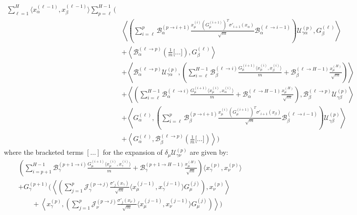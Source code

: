 \documentclass[11pt,a4paper]{article}
\theoremstyle{definition}
\begin{document}
\begin{align}
    \sum_{\ell=1}^{H} \langle x^{(\ell-1)}_\alpha, x^{(\ell-1)}_\beta \rangle \sum_{p=\ell}^{H-1} \Biggl( & \nonumber \\
    & \left\langle \left( \sum_{i=\ell}^{p} \mathcal{B}^{(p \to i+1)}_\alpha \frac{x^{(i)}_\mu (G^{(i+1)}_\mu)^T \sigma'_{i+1}(x_\alpha)}{\sqrt{m}} \mathcal{B}^{(\ell \to i-1)}_\alpha \right) \mathcal{U}^{(p)}_{\gamma\alpha}, G^{(\ell)}_\beta \right\rangle \nonumber \\
    & + \left\langle \mathcal{B}^{(\ell \to p)}_{\alpha} \left( \frac{1}{m} \Big[ \dots \Big] \right), G^{(\ell)}_\beta \right\rangle \nonumber \\
    & + \left\langle \mathcal{B}^{(\ell \to p)}_{\alpha} \mathcal{U}^{(p)}_{\gamma\alpha}, \left( \sum_{i=\ell}^{H-1} \mathcal{B}^{(\ell \to i)}_{\beta} \frac{G^{(i+1)}_\mu \langle x^{(i)}_\mu, x^{(i)}_\beta \rangle}{m} + \mathcal{B}^{(\ell \to H-1)}_{\beta} \frac{x^{(H)}_\mu}{\sqrt{m}} \right) \right\rangle \nonumber \\
    & + \left\langle \left( \sum_{i=\ell}^{H-1} \mathcal{B}^{(\ell \to i)}_{\alpha} \frac{G^{(i+1)}_\mu \langle x^{(i)}_\mu, x^{(i)}_\alpha \rangle}{m} + \mathcal{B}^{(\ell \to H-1)}_{\alpha} \frac{x^{(H)}_\mu}{\sqrt{m}} \right), \mathcal{B}^{(\ell \to p)}_{\beta} \mathcal{U}^{(p)}_{\gamma\beta} \right\rangle \nonumber \\
    & + \left\langle G^{(\ell)}_\alpha, \left( \sum_{i=\ell}^{p} \mathcal{B}^{(p \to i+1)}_\beta \frac{x^{(i)}_\mu (G^{(i+1)}_\mu)^T \sigma'_{i+1}(x_\beta)}{\sqrt{m}} \mathcal{B}^{(\ell \to i-1)}_\beta \right) \mathcal{U}^{(p)}_{\gamma\beta} \right\rangle \nonumber \\
    & + \left\langle G^{(\ell)}_\alpha, \mathcal{B}^{(\ell \to p)}_{\beta} \left( \frac{1}{m} \Big[ \dots \Big] \right) \right\rangle \Biggr)
    \end{align}
    where the bracketed terms $[\dots]$ for the expansion of $\delta_\mu\mathcal{U}^{(p)}_{\gamma\nu}$ are given by:
    \begin{align}
    & \left( \sum_{i=p+1}^{H-1} \mathcal{B}^{(p+1 \to i)}_{\gamma} \frac{G^{(i+1)}_\mu \langle x^{(i)}_\mu, x^{(i)}_\gamma \rangle}{m} + \mathcal{B}^{(p+1 \to H-1)}_{\gamma} \frac{x^{(H)}_\mu}{\sqrt{m}} \right) \langle x^{(p)}_\gamma, x^{(p)}_\nu \rangle \nonumber \\
    & + G^{(p+1)}_\gamma \Biggl( \left\langle \left( \sum_{j=1}^{p} \mathcal{J}^{(p \to j)}_{\gamma} \frac{\sigma'_{j}(x_\gamma)}{\sqrt{m}} \langle x^{(j-1)}_\mu, x^{(j-1)}_\gamma \rangle G^{(j)}_\mu \right), x^{(p)}_\nu \right\rangle \nonumber \\
    & \qquad + \left\langle x^{(p)}_\gamma, \left( \sum_{j=1}^{p} \mathcal{J}^{(p \to j)}_{\nu} \frac{\sigma'_{j}(x_\nu)}{\sqrt{m}} \langle x^{(j-1)}_\mu, x^{(j-1)}_\nu \rangle G^{(j)}_\mu \right) \right\rangle \Biggr)
\end{align}
\end{document}
